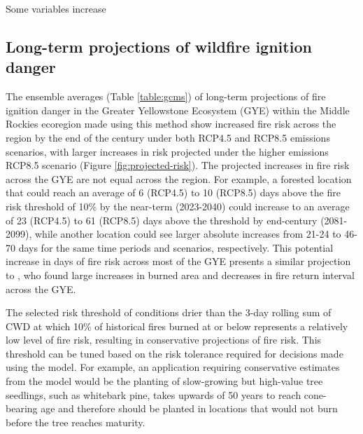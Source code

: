 \documentclass[11pt]{article}
\begin{document}
Some variables increase


\subsection{Long-term projections of wildfire ignition danger}

The ensemble averages (Table \ref{table:gcms}) of long-term projections of fire ignition danger in the Greater Yellowstone Ecosystem (GYE) within the Middle Rockies ecoregion made using this method show increased fire risk across the region by the end of the century under both RCP4.5 and RCP8.5 emissions scenarios, with larger increases in risk projected under the higher emissions RCP8.5 scenario (Figure \ref{fig:projected-risk}). The projected increases in fire risk across the GYE are not equal across the region.  For example, a forested location that could reach an average of 6 (RCP4.5) to 10 (RCP8.5) days above the fire risk threshold of 10\% by the near-term (2023-2040) could increase to an average of 23 (RCP4.5) to 61 (RCP8.5) days above the threshold by end-century (2081-2099), while another location could see larger absolute increases from 21-24 to 46-70 days for the same time periods and scenarios, respectively.  This potential increase in days of fire risk across most of the GYE presents a similar projection to \citet{westerlingContinuedWarmingCould2011}, who found large increases in burned area and decreases in fire return interval across the GYE.  

The selected risk threshold of conditions drier than the 3-day rolling sum of CWD at which 10\% of historical fires burned at or below represents a relatively low level of fire risk, resulting in conservative projections of fire risk.  This threshold can be tuned based on the risk tolerance required for decisions made using the model.  For example, an application requiring conservative estimates from the model would be the planting of slow-growing but high-value tree seedlings, such as whitebark pine, takes upwards of 50 years to reach cone-bearing age and therefore should be planted in locations that would not burn before the tree reaches maturity.

\end{document}
